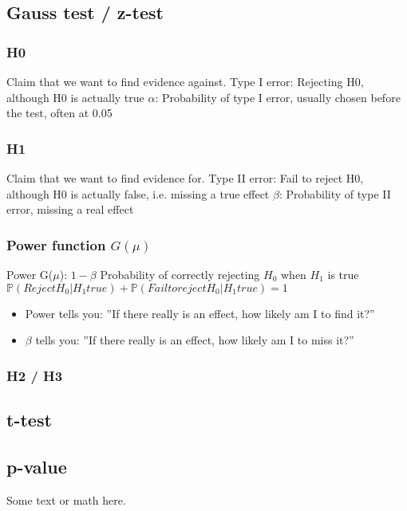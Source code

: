 \documentclass{article}
\begin{document}
\subsection{Gauss test / z-test}
  \subsubsection{H0}
  Claim that we want to find evidence against.
  \newline
  Type I error: Rejecting H0, although H0 is actually true
  \newline
  \(\alpha\): Probability of type I error, usually chosen before the test, often at 0.05
  \subsubsection{H1}
  Claim that we want to find evidence for.
  Type II error: Fail to reject H0, although H0 is actually false, i.e. missing a true effect
  $\beta$: Probability of type II error, missing a real effect
  \subsubsection{Power function \texorpdfstring{$G(\mu)$}{G (mu)}}

  Power G(\(\mu\)): \(1-\beta\)
  \newline
  Probability of correctly rejecting \(H_0\) when \(H_1\) is true
  $\mathbb{P}(Reject H_0 | H_1 true) + \mathbb{P}(Fail to reject H_0 | H_1 true) = 1$

  \begin{itemize}
    \item Power tells you: ''If there really is an effect, how likely am I to find it?''
    \item $\beta$ tells you: ''If there really is an effect, how likely am I to miss it?''
  \end{itemize}

  \subsubsection{H2 / H3}

\subsection{t-test}
\subsection{p-value}

Some text or math here.
\end{document}
